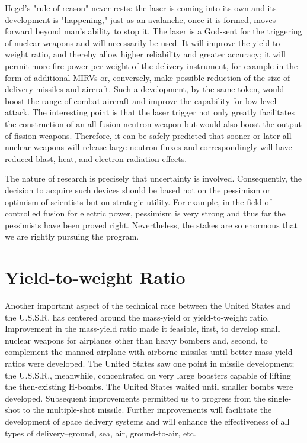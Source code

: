 Hegel's "rule of reason" never rests: the laser is coming into its own and its development is "happening," just as an avalanche, once it is formed, moves forward beyond man's ability to stop it. The laser is a God-sent for the triggering of nuclear weapons and will necessarily be used. It will improve the yield-to-weight ratio, and thereby allow higher reliability and greater accuracy; it will permit more fire power per weight of the delivery instrument, for example in the form of additional MIRVs or, conversely, make possible reduction of the size of delivery missiles and aircraft. Such a development, by the same token, would boost the range of combat aircraft and improve the capability for low-level attack. The interesting point is that the laser trigger not only greatly facilitates the construction of an all-fusion neutron weapon but would also boost the output of fission weapons. Therefore, it can be safely predicted that sooner or later all nuclear weapons will release large neutron fluxes and correspondingly will have reduced blast, heat, and electron radiation effects.

The nature of research is precisely that uncertainty is involved. Consequently, the decision to acquire such devices should be based not on the pessimism or optimism of scientists but on strategic utility. For example, in the field of controlled fusion for electric power, pessimism is very strong and thus far the pessimists have been proved right. Nevertheless, the stakes are so enormous that we are rightly pursuing the program.

\section{Yield-to-weight Ratio}
Another important aspect of the technical race between the United States and the U.S.S.R. has centered around the mass-yield or yield-to-weight ratio. Improvement in the mass-yield ratio made it feasible, first, to develop small nuclear weapons for airplanes other than heavy bombers and, second, to complement the manned airplane with airborne missiles until better mass-yield ratios were developed. The United States saw one point in missile development; the U.S.S.R., meanwhile, concentrated on very large boosters capable of lifting the then-existing H-bombs. The United States waited until smaller bombs were developed. Subsequent improvements permitted us to progress from the single-shot to the multiple-shot missile. Further improvements will facilitate the development of space delivery systems and will enhance the effectiveness of all types of delivery--ground, sea, air, ground-to-air, etc.

